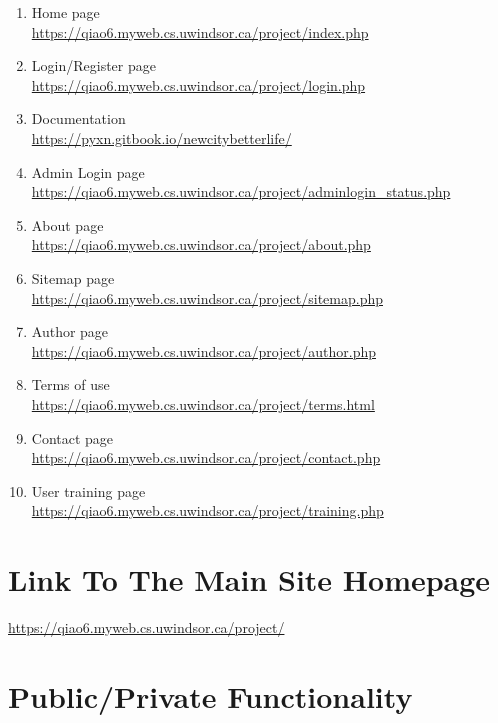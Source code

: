 \documentclass[12pt, letterpaper]{article}
\begin{document}
\begin{enumerate}
	\item Home page 			\\\url{https://qiao6.myweb.cs.uwindsor.ca/project/index.php}
	\item Login/Register page 	\\\url{https://qiao6.myweb.cs.uwindsor.ca/project/login.php}
	\item Documentation 		\\\url{https://pyxn.gitbook.io/newcitybetterlife/}
	\item Admin Login page 		\\\url{https://qiao6.myweb.cs.uwindsor.ca/project/adminlogin_status.php}
	\item About page 			\\\url{https://qiao6.myweb.cs.uwindsor.ca/project/about.php}
	\item Sitemap page 			\\\url{https://qiao6.myweb.cs.uwindsor.ca/project/sitemap.php}
	\item Author page 			\\\url{https://qiao6.myweb.cs.uwindsor.ca/project/author.php}
	\item Terms of use 			\\\url{https://qiao6.myweb.cs.uwindsor.ca/project/terms.html}
	\item Contact page 			\\\url{https://qiao6.myweb.cs.uwindsor.ca/project/contact.php}
	\item User training page 	\\\url{https://qiao6.myweb.cs.uwindsor.ca/project/training.php}
\end{enumerate}

\section{Link To The Main Site Homepage}
\url{https://qiao6.myweb.cs.uwindsor.ca/project/}

\section{Public/Private Functionality}
\end{document}
